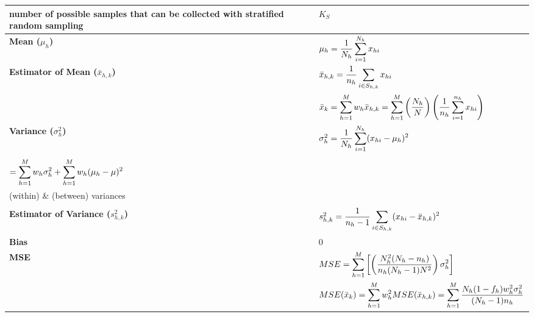 \begin{longtable}{|p{5cm}|p{9cm}|}
    \hline\endfirsthead
    \hline\endhead
    \hline\endfoot
    \hline\endlastfoot

    number of possible samples that can be collected with stratified random sampling & $K_S$\\
    \hline

    \textbf{Mean ($\mu_h$)} & $
        \mu_h = \dfrac{1}{N_h} 
        \displaystyle\sum_{i=1}^{N_h} x_{hi}
    $\\[1ex]
    \hline

    \textbf{Estimator of Mean ($\bar{x}_{h,k}$)} & $
        \bar{x}_{h,k} = \dfrac{1}{n_h} 
        \displaystyle\sum_{i\in S_{h,k}} x_{hi}
    $\\[1ex]
    & $
        \bar{x}_{k} = \displaystyle\sum_{h=1}^{M}
        w_h\bar{x}_{h,k}
        = \displaystyle\sum_{h=1}^{M}
        \left(\dfrac{N_h}{N}\right)
        \left(
            \dfrac{1}{n_h} 
            \displaystyle\sum_{i=1}^{n_h} x_{hi}
        \right)
    $\\[1ex]
    \hline

    \textbf{Variance ($\sigma_h^2$)} & $
        \sigma_h^2=\dfrac{1}{N_h}
        \displaystyle\sum_{i=1}^{N_h}
        (x_{hi} - \mu_{h})^2
    $\\[1ex]
    & \begin{minipage}{5cm}
        $\sigma^2 = \dfrac{1}{N}
        \dsum_{h=1}^{M}
        \dsum_{i=1}^{N_h}
        (x_{hi}-\mu)^2$ \\
        $=\displaystyle\sum_{h=1}^{M} w_h\sigma_h^2 +
        \displaystyle\sum_{h=1}^{M} w_h(\mu_h - \mu)^2$\\
        (within) \& (between) variances\\
        \vspace{0.1cm}
    \end{minipage}
    \\[2ex]
    \hline

    \textbf{Estimator of Variance ($s_{h,k}^2$)} & $
        s_{h,k}^2 = 
        \dfrac{1}{n_h - 1}
        \displaystyle\sum_{i\in S_{h,k}}
        (x_{hi} - \bar{x}_{h,k})^2
    $\\
    \hline

    \textbf{Bias} & 0\\
    \hline

    \textbf{MSE} & $
        MSE = \displaystyle\sum_{h=1}^{M}
        \left[
            \left(
                \dfrac{N_h^2(N_h-n_h)}{n_h(N_h-1)N^2}
            \right)
            \sigma_h^2
        \right]
    $\\[1ex]
    & $
        MSE(\bar{x}_k) = \displaystyle\sum_{h=1}^{M}
        w_h^2 MSE(\bar{x}_{h,k})
        = \displaystyle\sum_{h=1}^{M}
        \dfrac{N_h(1-f_h)w_h^2\sigma_h^2}{(N_h-1)n_h}
    $\\[1ex]
    \hline


\end{longtable}

